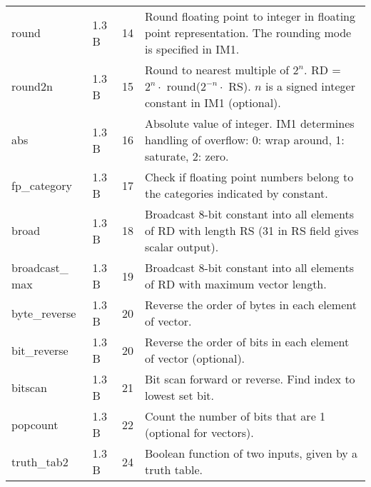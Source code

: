 \documentclass[forwardcom.tex]{subfiles}
\begin{document}
\begin{longtable} {|p{25mm}|p{12mm}|p{12mm}|p{95mm}|}
round         & 1.3 B & 14 & Round floating point to integer in floating point  representation. The rounding mode is specified in IM1. \\
round2n       & 1.3 B & 15 & Round to nearest multiple of $2^n$. \newline 
RD = $2^n\cdot$ round($2^{-n}\cdot$ RS). $n$ is a signed integer constant in IM1 (optional). \\
abs           & 1.3 B & 16 & Absolute value of integer. IM1 determines handling of overflow: 0: wrap around, 1: saturate, 2: zero. \\

fp\_category  & 1.3 B & 17 & Check if floating point numbers belong to the categories indicated by constant. \\

broad         & 1.3 B & 18 & Broadcast 8-bit constant into all elements of RD with length RS (31 in RS field gives scalar output). \\

broadcast\_ max & 1.3 B & 19 & Broadcast 8-bit constant into all elements of RD with maximum vector length. \\

byte\_reverse & 1.3 B & 20 & Reverse the order of bytes in each element of vector. \\
bit\_reverse  & 1.3 B & 20 & Reverse the order of bits in each element of vector (optional). \\

bitscan       & 1.3 B & 21 & Bit scan forward or reverse. Find index to lowest set bit. \\

popcount      & 1.3 B & 22 & Count the number of bits that are 1 (optional for vectors). \\
truth\_tab2   & 1.3 B & 24 & Boolean function of two inputs, given by a truth table. \\


\end{longtable}
\end{document}
